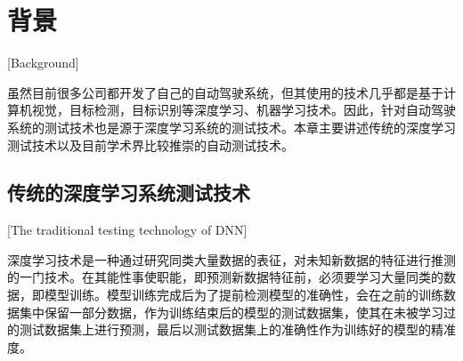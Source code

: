 
\chapter{背景}[Background]

虽然目前很多公司都开发了自己的自动驾驶系统，但其使用的技术几乎都是基于计算机视觉，目标检测，目标识别等深度学习、机器学习技术。因此，针对自动驾驶系统的测试技术也是源于深度学习系统的测试技术。本章主要讲述传统的深度学习测试技术以及目前学术界比较推崇的自动测试技术。

\section{传统的深度学习系统测试技术}[The traditional testing technology of DNN]

深度学习技术是一种通过研究同类大量数据的表征，对未知新数据的特征进行推测的一门技术。在其能性事使职能，即预测新数据特征前，必须要学习大量同类的数据，即模型训练。模型训练完成后为了提前检测模型的准确性，会在之前的训练数据集中保留一部分数据，作为训练结束后的模型的测试数据集，使其在未被学习过的测试数据集上进行预测，最后以测试数据集上的准确性作为训练好的模型的精准度。

